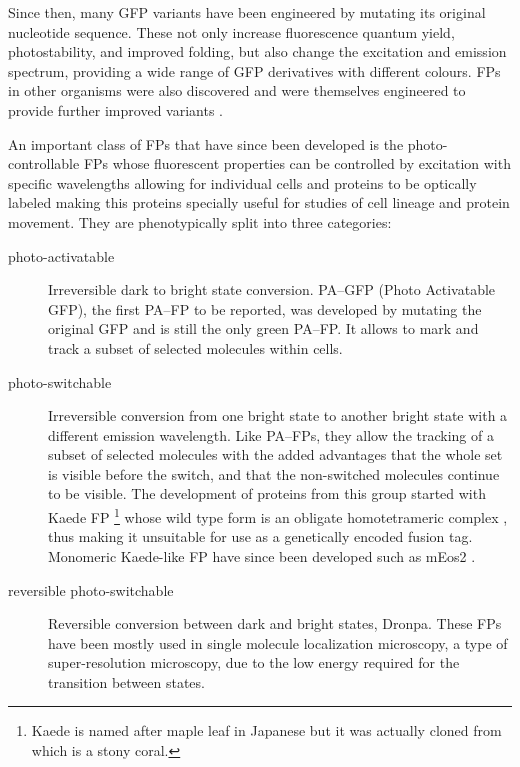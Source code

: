     Since then, many GFP variants have been engineered by mutating its
    original nucleotide sequence.  These not only increase fluorescence
    quantum yield, photostability, and improved folding, but also change
    the excitation and emission spectrum, providing a wide range of GFP
    derivatives with different colours.  FPs in other organisms were also
    discovered and were themselves engineered to provide further improved
    variants \citep{FP-color-palette}.

    An important class of FPs that have since been developed is the
    photo-controllable FPs whose
    fluorescent properties can be controlled by excitation with specific
    wavelengths allowing for individual cells and proteins to be optically
    labeled making this proteins specially useful for studies of cell
    lineage and protein movement.
    They are phenotypically split into three categories:

    \begin{description}
      \item[photo-activatable]
        Irreversible dark to bright state conversion.
        PA--GFP (Photo Activatable GFP), the first PA--FP to be
        reported, was developed by mutating the original GFP
        \citep{pagfp-discovery} and is
        still the only green PA--FP.
        It allows to mark and track a subset of selected molecules
        within cells.

      \item[photo-switchable]
        Irreversible conversion from one bright state to another bright
        state with a different emission wavelength.
        Like PA--FPs, they allow the tracking of a subset of selected
        molecules with the added advantages that the whole set is visible
        before the switch, and that the non-switched molecules continue
        to be visible.
        The development of proteins from this group started with Kaede FP
        \footnote{Kaede is named after maple leaf in Japanese but it was
        actually cloned from  which is a
        stony coral.} whose wild type form is an obligate homotetrameric
        complex \citep{kaede-discovery}, thus making it
        unsuitable for use as a genetically encoded fusion tag.
        Monomeric Kaede-like FP have since been developed such as
        mEos2 \citep{meos2-discovery}.

      \item[reversible photo-switchable]
        Reversible conversion between dark and bright states, \eg Dronpa.
        These FPs have been mostly used in single molecule localization
        microscopy, a type of super-resolution microscopy, due to the
        low energy required for the transition between states.

    \end{description}


